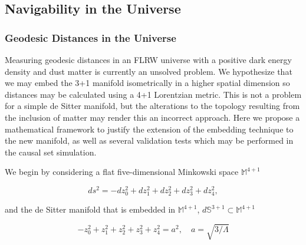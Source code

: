 \documentclass[preprint,notitlepage,amsmath,amssymb,floatfix]{revtex4-1}
\begin{document}

\subsection{Navigability in the Universe}
\subsubsection{Geodesic Distances in the Universe}
Measuring geodesic distances in an FLRW universe with a positive dark energy density and dust matter is currently an unsolved problem.  
We hypothesize that we may embed the 3+1 manifold isometrically in a higher spatial dimension so distances may be calculated using a 4+1 Lorentzian metric.  
This is not a problem for a simple de Sitter manifold, but the alterations to the topology resulting from the inclusion of matter may render this an incorrect approach.  
Here we propose a mathematical framework to justify the extension of the embedding technique to the new manifold, as well as several validation tests which may be performed in the causal set simulation. \par
We begin by considering a flat five-dimensional Minkowski space $\mathbb{M}^{4+1}$

\begin{equation}
ds^2 = -dz_0^2 + dz_1^2 + dz_2^2 + dz_3^2 + dz_4^2,
\end{equation}

\noindent and the de Sitter manifold that is embedded in $\mathbb{M}^{4+1}$, $d\mathbb{S}^{3+1}\subset\mathbb{M}^{4+1}$

\begin{equation}
-z_0^2 + z_1^2 + z_2^2 + z_3^2 + z_4^2 = a^2, \quad a = \sqrt{3/\Lambda}
\end{equation}
\end{document}
